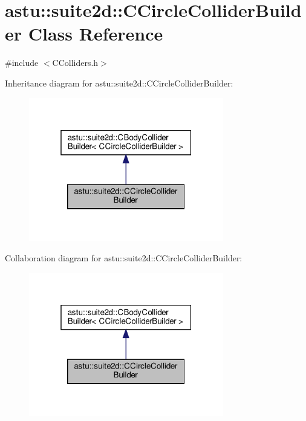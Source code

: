 \hypertarget{classastu_1_1suite2d_1_1CCircleColliderBuilder}{}\section{astu\+:\+:suite2d\+:\+:C\+Circle\+Collider\+Builder Class Reference}
\label{classastu_1_1suite2d_1_1CCircleColliderBuilder}


{\ttfamily \#include $<$C\+Colliders.\+h$>$}



Inheritance diagram for astu\+:\+:suite2d\+:\+:C\+Circle\+Collider\+Builder\+:\nopagebreak
\begin{figure}[H]
\begin{center}
\leavevmode
\includegraphics[width=241pt]{classastu_1_1suite2d_1_1CCircleColliderBuilder__inherit__graph}
\end{center}
\end{figure}


Collaboration diagram for astu\+:\+:suite2d\+:\+:C\+Circle\+Collider\+Builder\+:\nopagebreak
\begin{figure}[H]
\begin{center}
\leavevmode
\includegraphics[width=241pt]{classastu_1_1suite2d_1_1CCircleColliderBuilder__coll__graph}
\end{center}
\end{figure}
